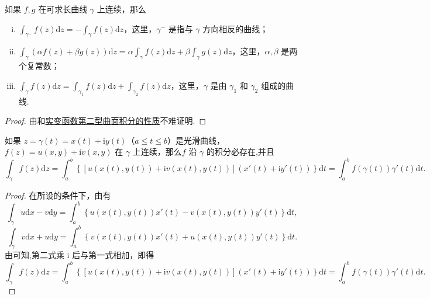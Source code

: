 \documentclass[../../main.tex]{subfiles}%
\begin{document}
\begin{theorem}\label{theorem:复积分的基本性质}
如果 \( f, g \) 在可求长曲线 \( \gamma \) 上连续，那么
\begin{enumerate}[(i)]
\item \( \int_{\gamma^-} f(z)\mathrm{d}z = -\int_\gamma f(z)\mathrm{d}z \)，这里，\( \gamma^- \) 是指与 \( \gamma \) 方向相反的曲线；

\item \( \int_\gamma (\alpha f(z) + \beta g(z))\mathrm{d}z = \alpha \int_\gamma f(z)\mathrm{d}z + \beta \int_\gamma g(z)\mathrm{d}z \)，这里，\( \alpha, \beta \) 是两个复常数；

\item \( \int_\gamma f(z)\mathrm{d}z = \int_{\gamma_1} f(z)\mathrm{d}z + \int_{\gamma_2} f(z)\mathrm{d}z \)，这里，\( \gamma \) 是由 \( \gamma_1 \) 和 \( \gamma_2 \) 组成的曲线.
\end{enumerate}
\end{theorem}
\begin{proof}
由和\hyperref[Basis Analytics-theorem:第二型曲线积分的基本性质]{实变函数第二型曲面积分的性质}不难证明.
\end{proof}

\begin{theorem}\label{theorem:复变函数积分参数方程形式}
如果 \( z = \gamma(t) =x(t) + \mathrm{i}y(t)\)（\( a \leqslant t \leqslant b \)）是光滑曲线，\(  f(z)= u(x,y) + \mathrm{i}v(x,y) \) 在 \( \gamma \) 上连续，那么\( f \) 沿 \( \gamma \) 的积分必存在,并且
\[
\int_\gamma f(z)\mathrm{d}z
= \int_a^b \left\{ [u(x(t), y(t)) + \mathrm{i}v(x(t), y(t))](x'(t) + \mathrm{i}y'(t)) \right\} \mathrm{d}t
= \int_a^b f(\gamma(t))\gamma'(t)\mathrm{d}t.
\]
\end{theorem}
\begin{proof}
在所设的条件下，由有
\[
\int_\gamma u \mathrm{d}x - v \mathrm{d}y
= \int_a^b \left\{ u(x(t), y(t))x'(t) - v(x(t), y(t))y'(t) \right\} \mathrm{d}t,
\]
\[
\int_\gamma v \mathrm{d}x + u \mathrm{d}y
= \int_a^b \left\{ v(x(t), y(t))x'(t) + u(x(t), y(t))y'(t) \right\} \mathrm{d}t.
\]
由可知,第二式乘 \( \mathrm{i} \) 后与第一式相加，即得
\[
\int_\gamma f(z)\mathrm{d}z
= \int_a^b \left\{ [u(x(t), y(t)) + \mathrm{i}v(x(t), y(t))](x'(t) + \mathrm{i}y'(t)) \right\} \mathrm{d}t
= \int_a^b f(\gamma(t))\gamma'(t)\mathrm{d}t.
\]
\end{proof}
\end{document}
